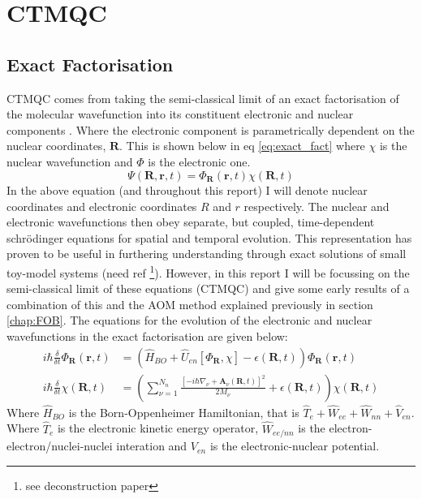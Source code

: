 
\chapter{CTMQC}
\label{chap:CTMQC}


\section{Exact Factorisation}
CTMQC comes from taking the semi-classical limit of an exact factorisation of the molecular wavefunction into its constituent electronic and nuclear components \cite{abedi_exact_2010}. Where the electronic component is parametrically dependent on the nuclear coordinates, $\textbf{R}$. This is shown below in eq \eqref{eq:exact_fact} where $\chi$ is the nuclear wavefunction and $\Phi$ is the electronic one.
\begin{equation}
 \Psi(\textbf{R}, \textbf{r}, t) = \Phi_{\textbf{R}}(\textbf{r}, t) \chi(\textbf{R}, t)
 \label{eq:exact_fact}
 \end{equation}
In the above equation (and throughout this report) I will denote nuclear coordinates and electronic coordinates $R$ and $r$ respectively. The nuclear and electronic wavefunctions then obey separate, but coupled, time-dependent schr\"odinger equations for spatial and temporal evolution. This representation has proven to be useful in furthering understanding through exact solutions of small toy-model systems (need ref \footnote{see deconstruction paper}). However, in this report I will be focussing on the semi-classical limit of these equations (CTMQC) and give some early results of a combination of this and the AOM method explained previously in section \ref{chap:FOB}.
The equations for the evolution of the electronic and nuclear wavefunctions in the exact factorisation \cite{abedi_exact_2010} are given below:
\begin{align}
  i\hbar \frac{\delta}{\delta t} \Phi_{\textbf{R}}(\textbf{r}, t) &= \left( \hat{H}_{BO} + \hat{U}_{en}\left[ \Phi_{\textbf{R}}, \chi\right] - \epsilon(\textbf{R}, t) \right) \Phi_{\textbf{R}} (\textbf{r}, t)
  \label{eq:electronic_exact}
\\
i\hbar \frac{\delta}{\delta t} \chi (\textbf{R}, t) &= \left( \sum_{\nu = 1}^{N_{n}} \frac{[-i\hbar\nabla_{\nu} + \textbf{A}_{\nu}(\textbf{R}, t)]^2}{2 M_{\nu}} + \epsilon(\textbf{R}, t)\right) \chi (\textbf{R}, t)
  \label{eq:nuclear_exact}
\end{align}
Where $\hat{H}_{BO}$ is the Born-Oppenheimer Hamiltonian, that is $\hat{T}_{e} + \hat{W}_{ee} + \hat{W}_{nn} + \hat{V}_{en}$. Where $\hat{T}_{e}$ is the electronic kinetic energy operator, $\hat{W}_{ee/nn}$ is the electron-electron/nuclei-nuclei interation and $V_{en}$ is the electronic-nuclear potential.
